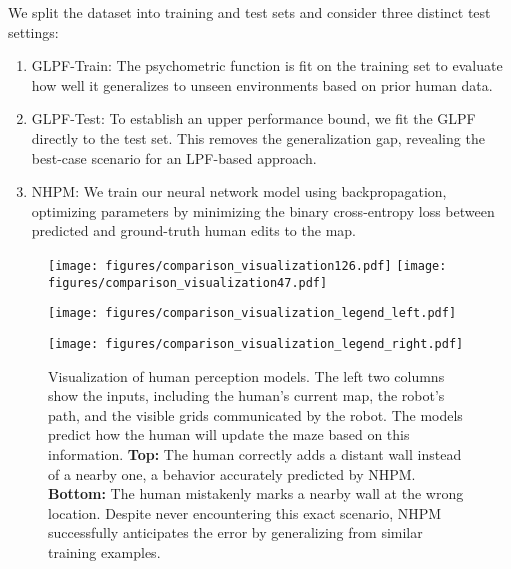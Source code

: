 We split the dataset into training and test sets and consider three distinct test settings:
\begin{enumerate}[leftmargin=*]
    \item GLPF-Train: The psychometric function is fit on the training set to evaluate how well it generalizes to unseen environments based on prior human data.
    \item GLPF-Test: To establish an upper performance bound, we fit the GLPF directly to the test set. This removes the generalization gap, revealing the best-case scenario for an LPF-based approach.
    \item NHPM: We train our neural network model using backpropagation, optimizing parameters by minimizing the binary cross-entropy loss between predicted and ground-truth human edits to the map.
\end{enumerate}

\begin{figure*}
    \centering
    \texttt{[image: figures/comparison\_visualization126.pdf]}
    \texttt{[image: figures/comparison\_visualization47.pdf]}
    \begin{minipage}{0.38\linewidth}
        \centering
        \vspace{-10pt}
        \texttt{[image: figures/comparison\_visualization\_legend\_left.pdf]}
    \end{minipage}
    \hspace{0.02\linewidth}
    \begin{minipage}{0.57\linewidth}
        \centering
        \vspace{3pt}
        \texttt{[image: figures/comparison\_visualization\_legend\_right.pdf]}
    \end{minipage}
    \caption{Visualization of human perception models. The left two columns show the inputs, including the human's current map, the robot's path, and the visible grids communicated by the robot. The models predict how the human will update the maze based on this information. \textbf{Top:} The human correctly adds a distant wall instead of a nearby one, a behavior accurately predicted by NHPM. \textbf{Bottom:} The human mistakenly marks a nearby wall at the wrong location. Despite never encountering this exact scenario, NHPM successfully anticipates the error by generalizing from similar training examples.}
    \label{fig:GLPF_vs_NHPM}
    \vskip -0.1in
\end{figure*}


